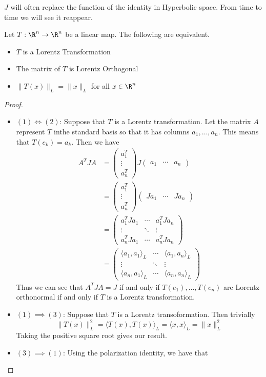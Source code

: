 $J$ will often replace the function of the identity in Hyperbolic space. From time to time we will see it reappear. 

\begin{prp}{}{} Let $T:\R^n\to\R^n$ be a linear map. The following are equivalent. 
\begin{itemize}
\item $T$ is a Lorentz Transformation
\item The matrix of $T$ is Lorentz Orthogonal
\item $\|T(x)\|_L=\|x\|_L$ for all $x\in\R^n$
\end{itemize} \tcbline
\begin{proof}~\\
\begin{itemize}
\item $(1)\iff(2)$: Suppose that $T$ is a Lorentz transformation. Let the matrix $A$ represent $T$ inthe standard basis so that it has columns $a_1,\dots,a_n$. This means that $T(e_k)=a_k$. Then we have 
\begin{align*}
A^TJA&=\begin{pmatrix}
a_1^T\\\vdots\\a_n^T
\end{pmatrix}J\begin{pmatrix}
a_1 & \cdots & a_n
\end{pmatrix}\\
&=\begin{pmatrix}
a_1^T\\\vdots\\a_n^T
\end{pmatrix}\begin{pmatrix}
Ja_1 & \cdots & Ja_n
\end{pmatrix}\\
&=\begin{pmatrix}
a_1^TJa_1 & \cdots & a_1^TJa_n\\
\vdots & \ddots & \vdots\\
a_n^TJa_1 & \cdots & a_n^TJa_n
\end{pmatrix}\\
&=\begin{pmatrix}
\langle a_1,a_1\rangle_L & \cdots & \langle a_1,a_n\rangle_L\\
\vdots & \ddots & \vdots\\
\langle a_n,a_1\rangle_L & \cdots & \langle a_n,a_n\rangle_L
\end{pmatrix}
\end{align*}
Thus we can see that $A^TJA=J$ if and only if $T(e_1),\dots, T(e_n)$ are Lorentz orthonormal if and only if $T$ is a Lorentz transformation. 
\item $(1)\implies(3)$: Suppose that $T$ is a Lorentz transoformation. Then trivially $$\|T(x)\|_L^2=\langle T(x),T(x)\rangle_L=\langle x,x\rangle_L=\|x\|_L^2$$ Taking the positive square root gives our result. 
\item $(3)\implies(1)$: Using the polarization identity, we have that 
\end{itemize}
\end{proof}
\end{prp}

